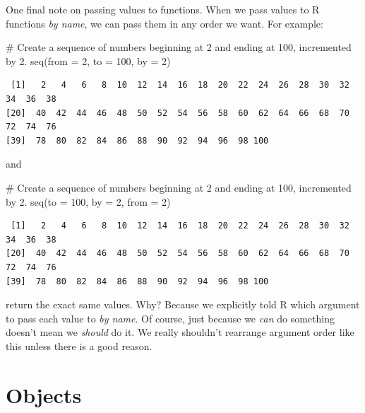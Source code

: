 \documentclass[
  letterpaper,
  DIV=11,
  numbers=noendperiod]{scrreprt}
\newenvironment{Shaded}{\begin{snugshade}}{\end{snugshade}}
\newcommand{\AttributeTok}[1]{\textcolor[rgb]{0.40,0.45,0.13}{#1}}
\newcommand{\CommentTok}[1]{\textcolor[rgb]{0.37,0.37,0.37}{#1}}
\newcommand{\DecValTok}[1]{\textcolor[rgb]{0.68,0.00,0.00}{#1}}
\newcommand{\FunctionTok}[1]{\textcolor[rgb]{0.28,0.35,0.67}{#1}}
\newcommand{\NormalTok}[1]{\textcolor[rgb]{0.00,0.23,0.31}{#1}}
\begin{document}
One final note on passing values to functions. When we pass values to R
functions \emph{by name}, we can pass them in any order we want. For
example:

\begin{Shaded}
\begin{Highlighting}[]
\CommentTok{\# Create a sequence of numbers beginning at 2 and ending at 100, incremented by 2.}
\FunctionTok{seq}\NormalTok{(}\AttributeTok{from =} \DecValTok{2}\NormalTok{, }\AttributeTok{to =} \DecValTok{100}\NormalTok{, }\AttributeTok{by =} \DecValTok{2}\NormalTok{)}
\end{Highlighting}
\end{Shaded}

\begin{verbatim}
 [1]   2   4   6   8  10  12  14  16  18  20  22  24  26  28  30  32  34  36  38
[20]  40  42  44  46  48  50  52  54  56  58  60  62  64  66  68  70  72  74  76
[39]  78  80  82  84  86  88  90  92  94  96  98 100
\end{verbatim}

and

\begin{Shaded}
\begin{Highlighting}[]
\CommentTok{\# Create a sequence of numbers beginning at 2 and ending at 100, incremented by 2.}
\FunctionTok{seq}\NormalTok{(}\AttributeTok{to =} \DecValTok{100}\NormalTok{, }\AttributeTok{by =} \DecValTok{2}\NormalTok{, }\AttributeTok{from =} \DecValTok{2}\NormalTok{)}
\end{Highlighting}
\end{Shaded}

\begin{verbatim}
 [1]   2   4   6   8  10  12  14  16  18  20  22  24  26  28  30  32  34  36  38
[20]  40  42  44  46  48  50  52  54  56  58  60  62  64  66  68  70  72  74  76
[39]  78  80  82  84  86  88  90  92  94  96  98 100
\end{verbatim}

return the exact same values. Why? Because we explicitly told R which
argument to pass each value to \emph{by name}. Of course, just because
we \emph{can} do something doesn't mean we \emph{should} do it. We
really shouldn't rearrange argument order like this unless there is a
good reason.

\section{Objects}\label{objects}
\end{document}
